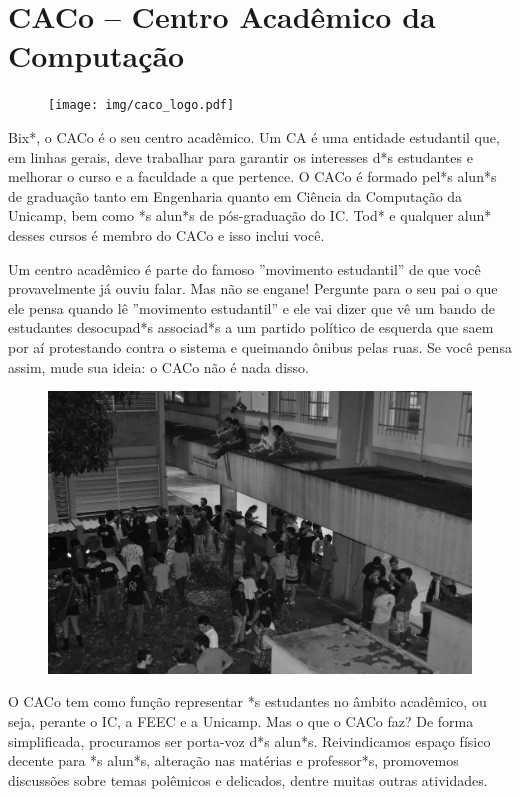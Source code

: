 
\section{CACo -- Centro Acadêmico da Computação}

\begin{figure}[H]
    \centering
    \texttt{[image: img/caco\_logo.pdf]}
\end{figure}

Bix*, o CACo é o seu centro acadêmico. Um CA é uma entidade estudantil que, em
linhas gerais, deve trabalhar para garantir os interesses d*s estudantes e
melhorar o curso e a faculdade a que pertence. O CACo é formado pel*s alun*s de
graduação tanto em Engenharia quanto em Ciência da Computação da Unicamp, bem
como *s alun*s de pós-graduação do IC. Tod* e qualquer alun* desses cursos é
membro do CACo e isso inclui você.

Um centro acadêmico é parte do famoso ''movimento estudantil'' de que você
provavelmente já ouviu falar. Mas não se engane! Pergunte para o seu pai o que
ele pensa quando lê ''movimento estudantil'' e ele vai dizer que vê um bando de
estudantes desocupad*s associad*s a um partido político de esquerda que saem por
aí protestando contra o sistema e queimando ônibus pelas ruas. Se você pensa
assim, mude sua ideia: o CACo não é nada disso.

\begin{figure}[H]
    \centering
    \includegraphics[width=.45\textwidth]{img/alem_da_graduacao/caco_karaoke.jpg}
\end{figure}

O CACo tem como função representar *s estudantes no âmbito acadêmico, ou seja,
perante o IC, a FEEC e a Unicamp. Mas o que o CACo faz? De forma simplificada,
procuramos ser porta-voz d*s alun*s. Reivindicamos espaço físico decente para *s
alun*s, alteração nas matérias e professor*s, promovemos discussões sobre temas
polêmicos e delicados, dentre muitas outras atividades.

